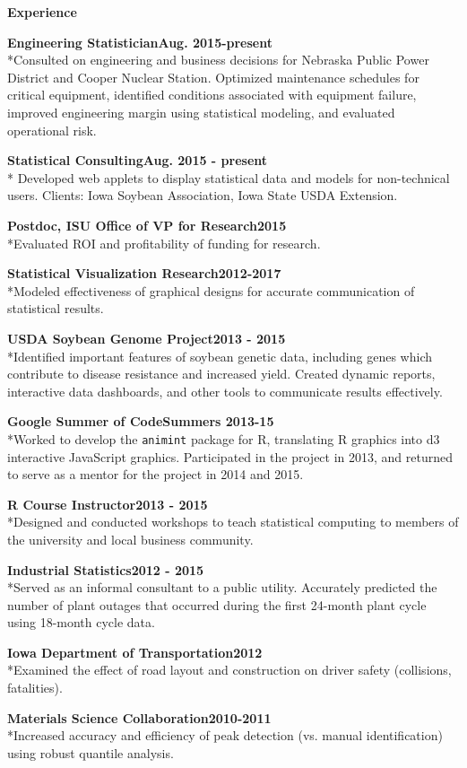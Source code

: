\documentclass[letterpaper,12pt,final]{memoir}
\newcommand{\MedSep}{\vspace{1em}}
\newcommand{\SmallSep}{\vspace{0.5em}}
\newcommand{\CVSection}[1]
	{\Large\textbf{#1}\par
	\SmallSep\normalsize\normalfont}
\newcommand{\CVItem}[1]
	{\textbf{\color{RoyalBlue} #1}}
\newcommand{\Experience}[3]{\parbox{\linewidth}{\CVItem{#1\hfill#2}\\*{\small #3\MedSep}}}
\begin{document}
\CVSection{Experience}
\begin{multicols}{2}
\Experience{Engineering Statistician}
{Aug. 2015-present}
{Consulted on engineering and business decisions for Nebraska Public Power District and Cooper Nuclear Station. Optimized maintenance schedules for critical equipment, identified conditions associated with equipment failure, improved engineering margin using statistical modeling, and evaluated operational risk.}

\Experience{Statistical Consulting}{Aug. 2015 - present}{
Developed web applets to display statistical data and models for non-technical users. Clients: Iowa Soybean Association, Iowa State USDA Extension.}

\Experience{Postdoc, ISU Office of VP for Research}
{2015}
{Evaluated ROI and profitability of funding for research.}

\Experience{Statistical Visualization Research}
{2012-2017}
{Modeled effectiveness of graphical designs for accurate communication of statistical results.}

\Experience{USDA Soybean Genome Project}
{2013 - 2015}
{Identified important features of soybean genetic data, including genes which contribute to disease resistance and increased yield. Created dynamic reports, interactive data dashboards, and other tools to communicate results effectively.}

\Experience{Google Summer of Code}
{Summers 2013-15}
{Worked to develop the \texttt{animint} package for R, translating R graphics into d3 interactive JavaScript graphics. Participated in the project in 2013, and returned to serve as a mentor for the project in 2014 and 2015.}

\Experience{R Course Instructor}
{2013 - 2015}
{Designed and conducted workshops to teach statistical computing to members of the university and local business community.}


\Experience{Industrial Statistics}
{2012 - 2015}
{Served as an informal consultant to a public utility. Accurately predicted the number of plant outages that occurred during the first 24-month plant cycle using 18-month cycle data. }

\Experience{Iowa Department of Transportation}
{2012}
{Examined the effect of road layout and construction on driver safety (collisions, fatalities).}

\Experience{Materials Science Collaboration}
{2010-2011}
{Increased accuracy and efficiency of peak detection (vs. manual identification) using robust quantile analysis. }
\end{multicols}
\end{document}
